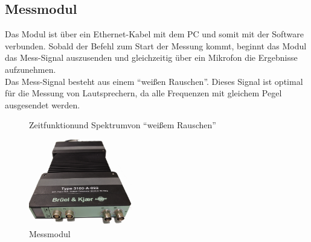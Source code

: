 \newpage
\subsection*{Messmodul}\label{subsec:4.1.2}
Das Modul ist über ein Ethernet-Kabel mit dem PC und somit mit der Software verbunden.
Sobald der Befehl zum Start der Messung kommt, beginnt das Modul das Mess-Signal auszusenden und gleichzeitig über ein Mikrofon die Ergebnisse aufzunehmen.
\\
Das Mess-Signal besteht aus einem \enquote{weißen Rauschen}.
Dieses Signal ist optimal für die Messung von Lautsprechern, da alle Frequenzen mit gleichem Pegel ausgesendet werden.
\begin{figure} [H]
	\centering
	\caption[Zeitfunktion und Spektrum von \enquote{weißem Rauschen}]{Zeitfunktion\footnotemark und Spektrum\footnotemark von \enquote{weißem Rauschen}}
	\label{fig:4.1.2.1}
\end{figure}
\begin{figure} [H]
	\centering
	\includegraphics[width=0.4\textwidth]{img/LSMessung/modul_front.png}
	\caption{Messmodul}
	\label{fig:4.1.2.2}
\end{figure}

